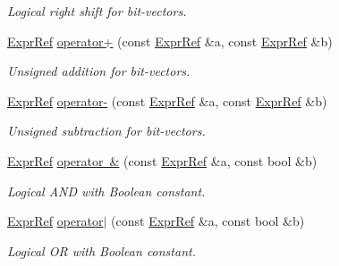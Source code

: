 \begin{DoxyCompactItemize}
\begin{DoxyCompactList}\small\item\em Logical right shift for bit-\/vectors. \end{DoxyCompactList}\item 
\mbox{\label{namespaceilang_a4a9fbd2386191e9a476af6dbae9ac4d1}} 
\mbox{\hyperlink{classilang_1_1_expr_ref}{Expr\+Ref}} \mbox{\hyperlink{namespaceilang_a4a9fbd2386191e9a476af6dbae9ac4d1}{operator+}} (const \mbox{\hyperlink{classilang_1_1_expr_ref}{Expr\+Ref}} \&a, const \mbox{\hyperlink{classilang_1_1_expr_ref}{Expr\+Ref}} \&b)
\begin{DoxyCompactList}\small\item\em Unsigned addition for bit-\/vectors. \end{DoxyCompactList}\item 
\mbox{\label{namespaceilang_a28362d954dc9512c7292ef91df694e37}} 
\mbox{\hyperlink{classilang_1_1_expr_ref}{Expr\+Ref}} \mbox{\hyperlink{namespaceilang_a28362d954dc9512c7292ef91df694e37}{operator-\/}} (const \mbox{\hyperlink{classilang_1_1_expr_ref}{Expr\+Ref}} \&a, const \mbox{\hyperlink{classilang_1_1_expr_ref}{Expr\+Ref}} \&b)
\begin{DoxyCompactList}\small\item\em Unsigned subtraction for bit-\/vectors. \end{DoxyCompactList}\item 
\mbox{\label{namespaceilang_a879d966b396169287ed8d4e734526d22}} 
\mbox{\hyperlink{classilang_1_1_expr_ref}{Expr\+Ref}} \mbox{\hyperlink{namespaceilang_a879d966b396169287ed8d4e734526d22}{operator \&}} (const \mbox{\hyperlink{classilang_1_1_expr_ref}{Expr\+Ref}} \&a, const bool \&b)
\begin{DoxyCompactList}\small\item\em Logical A\+ND with Boolean constant. \end{DoxyCompactList}\item 
\mbox{\label{namespaceilang_af4ad583ce28ae8f0a7acb3567d00d11a}} 
\mbox{\hyperlink{classilang_1_1_expr_ref}{Expr\+Ref}} \mbox{\hyperlink{namespaceilang_af4ad583ce28ae8f0a7acb3567d00d11a}{operator$\vert$}} (const \mbox{\hyperlink{classilang_1_1_expr_ref}{Expr\+Ref}} \&a, const bool \&b)
\begin{DoxyCompactList}\small\item\em Logical OR with Boolean constant. \end{DoxyCompactList}\item 

\end{DoxyCompactItemize}
